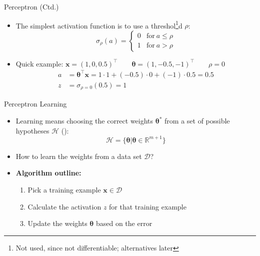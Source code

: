 \begin{frame}{Perceptron (Ctd.)}{}
	\begin{itemize}
		\item The simplest activation function is to use a threshol\footnote[frame]{Not used, since not differentiable;
			alternatives later}d $\rho$:
		\begin{equation*}
			\sigma_{\rho}(a) =
			\begin{cases}
				0 &	\text{for}\ a \le \rho \\
				1 & \text{for}\ a > \rho
			\end{cases}
		\end{equation*}
		\item Quick example: $\bm{x} = (1, 0, 0.5)^{\intercal} \qquad \bm{\theta} = (1, -0.5, -1)^{\intercal} \qquad \rho = 0$
		\begin{align*}
			a &= \bm{\theta}^{\intercal}\bm{x} = 1 \cdot 1 + (-0.5) \cdot 0 + (-1) \cdot 0.5 = 0.5 \\
			z &= \sigma_{\rho=0}(0.5) = 1
		\end{align*}
	\end{itemize}
\end{frame}


\begin{frame}{Perceptron Learning}{}
	\begin{itemize}
		\item Learning means choosing the correct weights $\bm{\theta}^*$ from a set of possible hypotheses $\mathcal{H}$
		():
		\begin{equation*}
			\mathcal{H} = \{ \bm{\theta} \vert \bm{\theta} \in \mathbb{R}^{m + 1} \}
		\end{equation*}
		\item How to learn the weights from a data set $\mathcal{D}$?
		\item \textbf{Algorithm outline:}
		\begin{enumerate}
			\item Pick a training example $\bm{x} \in \mathcal{D}$
			\item Calculate the activation $z$ for that training example
			\item Update the weights $\bm{\theta}$ based on the error
		\end{enumerate}
	\end{itemize}
\end{frame}


